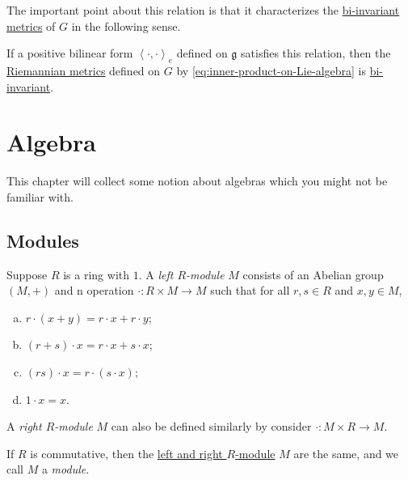 The important point about this relation is that it characterizes the \hyperref[def:Riemannian-metric-left-invariant]{bi-invariant} \hyperref[def:Riemannian-metric]{metrics} of \(G\) in the following sense.

\begin{remark}
	If a positive bilinear form \(\left\langle \cdot, \cdot \right\rangle _e \) defined on \(\mathfrak{g} \) satisfies this relation, then the \hyperref[def:Riemannian-metric]{Riemannian metrics} defined on \(G\) by \autoref{eq:inner-product-on-Lie-algebra} is \hyperref[def:Riemannian-metric-left-invariant]{bi-invariant}.
\end{remark}

\section{Algebra}
This chapter will collect some notion about algebras which you might not be familiar with.

\subsection{Modules}
\begin{definition}\label{def:left-module}
	Suppose \(R\) is a ring with \(1\). A \emph{left \(R\)-module} \(M\) consists of an Abelian group \((M, +)\) and n operation \(\cdot \colon R \times M \to M\) such that for all \(r, s\in R\) and \(x, y\in M\),
	\begin{enumerate}[(a)]
		\item \(r\cdot (x+y) = r\cdot x + r\cdot y\);
		\item \((r+s)\cdot x = r\cdot x + s\cdot x\);
		\item \((rs)\cdot x = r\cdot (s\cdot x)\);
		\item \(1\cdot x = x\).
	\end{enumerate}
\end{definition}

\begin{note}
	A \emph{right \(R\)-module} \(M\) can also be defined similarly by consider \(\cdot \colon M \times R \to M\).
\end{note}

\begin{definition}[Module]\label{def:module}
	If \(R\) is commutative, then the \hyperref[def:left-module]{left and right \(R\)-module} \(M\) are the same, and we call \(M\) a \emph{module}.
\end{definition}

